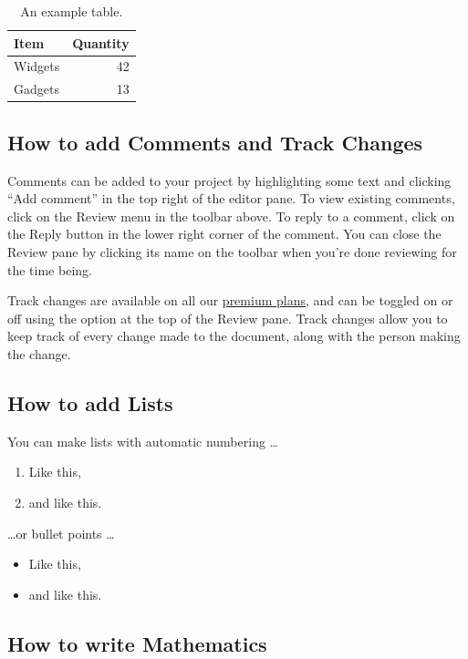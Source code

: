 \begin{table}
\centering
\begin{tabular}{l|r}
Item & Quantity \\\hline
Widgets & 42 \\
Gadgets & 13
\end{tabular}
\caption{\label{tab:widgets}An example table.}
\end{table}

\subsection{How to add Comments and Track Changes}\label{subsec:how-to-add-comments-and-track-changes}

Comments can be added to your project by highlighting some text and clicking ``Add comment'' in the top right of the editor pane.
To view existing comments, click on the Review menu in the toolbar above.
To reply to a comment, click on the Reply button in the lower right corner of the comment.
You can close the Review pane by clicking its name on the toolbar when you're done reviewing for the time being.

Track changes are available on all our \href{https://www.overleaf.com/user/subscription/plans}{premium plans}, and can be toggled on or off using the option at the top of the Review pane.
Track changes allow you to keep track of every change made to the document, along with the person making the change.

\subsection{How to add Lists}\label{subsec:how-to-add-lists}

You can make lists with automatic numbering \dots

\begin{enumerate}
\item Like this,
\item and like this.
\end{enumerate}
\dots or bullet points \dots
\begin{itemize}
\item Like this,
\item and like this.
\end{itemize}

\subsection{How to write Mathematics}\label{subsec:how-to-write-mathematics}


